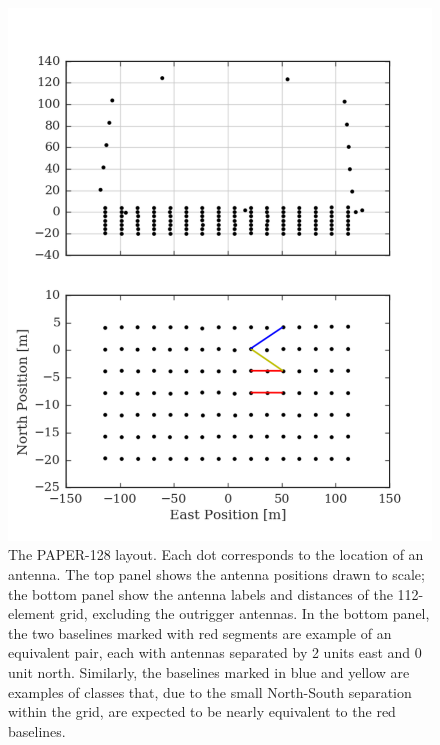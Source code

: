 \documentclass[twocolumn,apj,numberedappendix]{emulateapj}
\renewcommand\[{\begin{equation}}
\renewcommand\]{\end{equation}}
\begin{document}
\begin{figure}[H]
\includegraphics[width=\linewidth]{antconfig}

\caption{The PAPER-128 layout. Each dot corresponds to the location of
an antenna. The top panel shows the antenna positions drawn to scale;
the bottom panel show the antenna labels and distances of the 112-element grid, excluding the outrigger antennas.
In the bottom panel, the two baselines marked with red segments are example of an equivalent pair, each with antennas separated by 2 units east and 0 unit north. Similarly,
the baselines marked in blue and yellow are examples
of classes that, due to the small North-South separation within the grid, are expected to be nearly equivalent to the red baselines. }
\label{fig:AntPos}
\end{figure}
\end{document}
